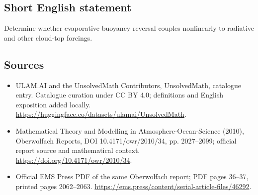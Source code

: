 \documentclass[11pt]{article}
\begin{document}
\subsection{Short English statement}
Determine whether evaporative buoyancy reversal couples nonlinearly to radiative and other cloud-top forcings.
\subsection{Sources}
\begin{itemize}
\item[\hypertarget{source:statement:1}{S1}] ULAM.AI and the UnsolvedMath Contributors, UnsolvedMath, catalogue entry. Catalogue curation under CC BY 4.0; definitions and English exposition added locally.
\url{https://huggingface.co/datasets/ulamai/UnsolvedMath}.
\item[\hypertarget{source:statement:2}{S2}] Mathematical Theory and Modelling in Atmosphere-Ocean-Science (2010), Oberwolfach Reports, DOI 10.4171/owr/2010/34, pp. 2027--2099; official report source and mathematical context.
\url{https://doi.org/10.4171/owr/2010/34}.
\item[\hypertarget{source:statement:3}{S3}] Official EMS Press PDF of the same Oberwolfach report; PDF pages 36--37, printed pages 2062--2063.
\url{https://ems.press/content/serial-article-files/46292}.
\end{itemize}
\label{end:statement}
\end{document}
